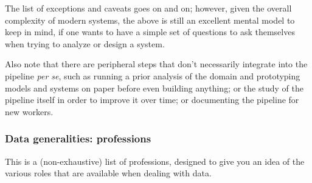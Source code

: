 \documentclass{article}
\begin{document}
\begin{itemize}
	The list of exceptions and caveats goes on and on; however, given the overall complexity of modern systems, the above is still an excellent mental model to keep in mind, if one wants to have a simple set of questions to ask themselves when trying to analyze or design a system.

	Also note that there are peripheral steps that don't necessarily integrate into the pipeline \textit{per se}, such as running a prior analysis of the domain and prototyping models and systems on paper before even building anything; or the study of the pipeline itself in order to improve it over time; or documenting the pipeline for new workers.

\end{itemize}



\subsubsection*{Data generalities: professions}

This is a (non-exhaustive) list of professions, designed to give you an idea of the various roles that are available when dealing with data.
\end{document}
